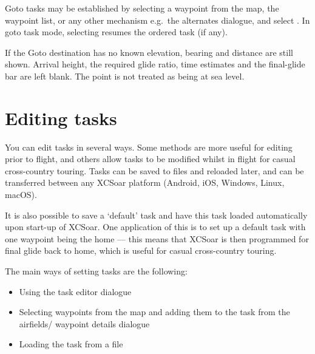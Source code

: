 Goto tasks may be established by selecting a waypoint from the map,
the waypoint list, or any other mechanism e.g.\ the alternates dialogue,
and select . In goto task mode, selecting
\blink{} resumes the ordered task (if
any).

If the Goto destination has no known elevation, bearing and distance
are still shown. Arrival height, the required glide ratio, time
estimates and the final-glide bar are left blank. The point is not
treated as being at sea level.

\section{Editing tasks}

You can edit tasks in several ways.  Some methods are more useful for
editing prior to flight, and others allow tasks to be modified whilst
in flight for casual cross-country touring.  Tasks can be saved to
files and reloaded later, and can be transferred between any XCSoar
platform (Android, iOS, Windows, Linux, macOS\textellipsis).

\tip{} It is also possible to save a `default' task and have this task loaded
automatically upon start-up of XCSoar.  One application of this is to
set up a default task with one waypoint being the home --- this means
that XCSoar is then programmed for final glide back to home, which is
useful for casual cross-country touring.

The main ways of setting tasks are the following:
\begin{itemize}
\item Using the task editor dialogue
\item Selecting waypoints from the map and adding them to the task from the
 airfields/ waypoint details dialogue
\item Loading the task from a file
\end{itemize}

%

